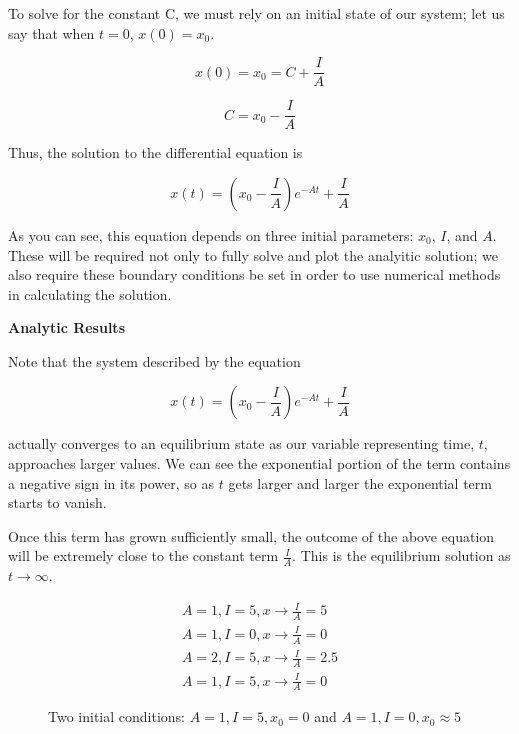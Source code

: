 \documentclass[a4paper,12pt]{article}
\begin{document}
To solve for the constant C, we must rely on an initial state of our system; let us say that when $t=0$, $x(0)=x_0$.

\begin{equation}
x(0) = x_0 = C + \frac{I}{A}
\end{equation}

\begin{equation}
C = x_0 - \frac{I}{A}
\end{equation}

Thus, the solution to the differential equation is 

\begin{equation}
x(t) = (x_0 - \frac{I}{A})e^{-At} + \frac{I}{A}
\end{equation}

As you can see, this equation depends on three initial parameters: $x_0$, $I$, and $A$. These will be required not only to fully solve and plot the analyitic solution; we also require these boundary conditions be set in order to use numerical methods in calculating the solution.

{\bf Analytic Results}
\bigskip 

Note that the system described by the equation 

\begin{equation}
x(t) = (x_0 - \frac{I}{A})e^{-At} + \frac{I}{A}
\end{equation}

actually converges to an equilibrium state as our variable representing time, $t$, approaches larger values. We can see the exponential portion of the term contains a negative sign in its power, so as $t$ gets larger and larger the exponential term starts to vanish. 

\vspace{2mm}

Once this term has grown sufficiently small, the outcome of the above equation will be extremely close to the constant term $\frac{I}{A}$. This is the equilibrium solution as $t\rightarrow\infty$. 

\begin{eqnarray}
A=1, I=5,  x\rightarrow\frac{I}{A}=5 \\
A=1, I=0,  x\rightarrow\frac{I}{A}=0 \\
A=2, I=5,  x\rightarrow\frac{I}{A}=2.5 \\
A=1, I=5,  x\rightarrow\frac{I}{A}=0
\label{array1}
\end{eqnarray}

\begin{figure}[!ht]
\begin{center}
\end{center}
\caption{\label{pict1} Two initial conditions: $A=1,I=5,x_0=0$ and $A=1,I=0,x_0\approx5$}
\end{figure} 
\end{document}
